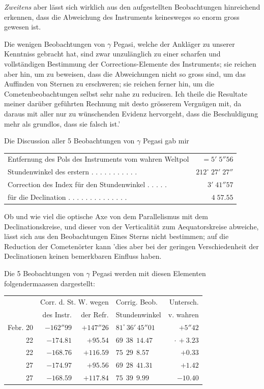\emph{Zweitens} aber lässt sich wirklich aus den aufgestellten Beobachtungen hinreichend erkennen, dass die Abweichung des Instruments keinesweges so enorm gross gewesen ist.

Die wenigen Beobachtungen von $\gamma$ Pegasi, welche der Ankläger zu unserer Kenntniss gebracht hat, sind zwar unzulänglich zu einer scharfen und vollständigen Bestimmung der Corrections-Elemente des Instruments; sie reichen aber hin, um zu beweisen, dass die Abweichungen nicht so gross sind, um das Auffinden von Sternen zu erschweren; sie reichen ferner hin, um die Cometenbeobachtungen selbst sehr nahe zu reduciren. Ich theile die Resultate meiner darüber geführten Rechnung mit desto grösserem Vergnügen mit, da daraus mit aller nur zu wünschenden Evidenz hervorgeht, dass die Beschuldigung mehr als grundlos, dass sie falsch ist.'

Die Discussion aller 5 Beobachtungen von $\gamma$ Pegasi gab mir
\begin{center}\footnotesize\setlength{\tabcolsep}{3pt}
\begin{tabular}{@{}l r@{}}
Entfernung des Pols des Instruments vom wahren Weltpol & $=5'\;5''56$\\
Stundenwinkel des erstern . . . . . . . . . . . & $212^\circ\;27'\;27''$\\
Correction des Index für den Stundenwinkel . . . . . & $3'\;41''57$\\
für die Declination . . . . . . . . . . . . . . & $4\;57.55$
\end{tabular}\end{center}

Ob und wie viel die optische Axe von dem Parallelismus mit dem Declinationskreise, und dieser von der Verticalität zum Aequatorskreise abweiche, lässt sich aus den Beobachtungen Eines Sterns nicht  bestimmen; auf die Reduction der Cometenörter kann 'dies aber bei der geringen Verschiedenheit der Declinationen keinen bemerkbaren Einfluss haben.

Die 5 Beobachtungen von $\gamma$ Pegasi werden mit diesen Elementen folgendermaassen
dargestellt:

\begin{center}\footnotesize\setlength{\tabcolsep}{4pt}
\begin{tabular}{r|r|r|l|r}
 & \multicolumn{2}{c|}{Corr. d. St. W. wegen} & Corrig. Beob. & Untersch.\\
 & des Instr. & der Refr. & Stundenwinkel & v. wahren \\
\hline
Febr. 20 & $-162''99$ & $+147''26$ & $81^\circ\,36'\,45''01$ & $+5''42$ \\
22 & $-174.81$ & $+95.54$ & $69\ \ 38\ \ 14.47$ & $\mathord{\cdot}\,+3.23$ \\
22 & $-168.76$ & $+116.59$ & $75\ \ 29\ \ 8.57$ & $+0.33$ \\
27 & $-174.97$ & $+95.56$ & $69\ \ 28\ \ 41.31$ & $+1.42$ \\
27 & $-168.59$ & $+117.84$ & $75\ \ 39\ \ 9.99$ & $-10.40$ \\
\end{tabular}
\end{center}

